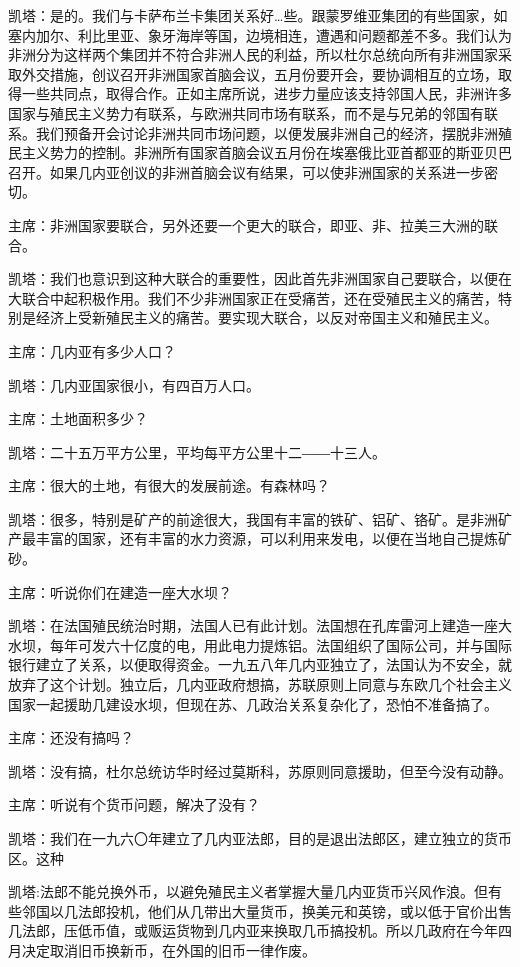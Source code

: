 凯塔：是的。我们与卡萨布兰卡集团关系好…些。跟蒙罗维亚集团的有些国家，如塞内加尔、利比里亚、象牙海岸等国，边境相连，遭遇和问题都差不多。我们认为非洲分为这样两个集团并不符合非洲人民的利益，所以杜尔总统向所有非洲国家采取外交措施，创议召开非洲国家首脑会议，五月份要开会，要协调相互的立场，取得一些共同点，取得合作。正如主席所说，进步力量应该支持邻国人民，非洲许多国家与殖民主义势力有联系，与欧洲共同市场有联系，而不是与兄弟的邻国有联系。我们预备开会讨论非洲共同市场问题，以便发展非洲自己的经济，摆脱非洲殖民主义势力的控制。非洲所有国家首脑会议五月份在埃塞俄比亚首都亚的斯亚贝巴召开。如果几内亚创议的非洲首脑会议有结果，可以使非洲国家的关系进一步密切。

主席：非洲国家要联合，另外还要一个更大的联合，即亚、非、拉美三大洲的联合。

凯塔：我们也意识到这种大联合的重要性，因此首先非洲国家自己要联合，以便在大联合中起积极作用。我们不少非洲国家正在受痛苦，还在受殖民主义的痛苦，特别是经济上受新殖民主义的痛苦。要实现大联合，以反对帝国主义和殖民主义。

主席：几内亚有多少人口？

凯塔：几内亚国家很小，有四百万人口。

主席：土地面积多少？

凯塔：二十五万平方公里，平均每平方公里十二――十三人。

主席：很大的土地，有很大的发展前途。有森林吗？

凯塔：很多，特别是矿产的前途很大，我国有丰富的铁矿、铝矿、铬矿。是非洲矿产最丰富的国家，还有丰富的水力资源，可以利用来发电，以便在当地自己提炼矿砂。

主席：听说你们在建造一座大水坝？

凯塔：在法国殖民统治时期，法国人已有此计划。法国想在孔库雷河上建造一座大水坝，每年可发六十亿度的电，用此电力提炼铝。法国组织了国际公司，并与国际银行建立了关系，以便取得资金。一九五八年几内亚独立了，法国认为不安全，就放弃了这个计划。独立后，几内亚政府想搞，苏联原则上同意与东欧几个社会主义国家一起援助几建设水坝，但现在苏、几政治关系复杂化了，恐怕不准备搞了。

主席：还没有搞吗？

凯塔：没有搞，杜尔总统访华时经过莫斯科，苏原则同意援助，但至今没有动静。

主席：听说有个货币问题，解决了没有？

凯塔：我们在一九六〇年建立了几内亚法郎，目的是退出法郎区，建立独立的货币区。这种

凯塔:法郎不能兑换外币，以避免殖民主义者掌握大量几内亚货币兴风作浪。但有些邻国以几法郎投机，他们从几带出大量货币，换美元和英镑，或以低于官价出售几法郎，压低币值，或贩运货物到几内亚来换取几币搞投机。所以几政府在今年四月决定取消旧币换新币，在外国的旧币一律作废。

